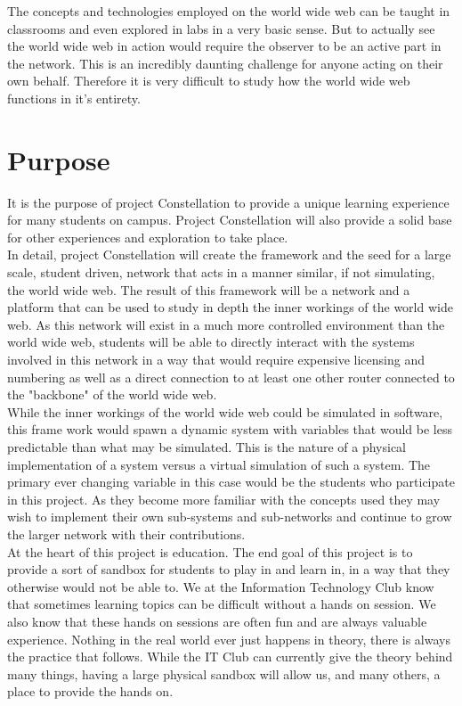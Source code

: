 \documentclass[12pt]{article}
\begin{document}
The concepts and technologies employed on the world wide web can be taught in classrooms and even explored in
labs in a very basic sense. But to actually see the world wide web in action would require the observer to
be an active part in the network. This is an incredibly daunting challenge for anyone acting on their own 
behalf. Therefore it is very difficult to study how the world wide web functions in it's entirety.

\clearpage{}

\section{Purpose}

It is the purpose of project Constellation to provide a unique learning experience for many students on campus. Project Constellation
will also provide a solid base for other experiences and exploration to take place. 
\\

In detail, project Constellation will create the framework and the seed for a large scale, student driven, network that acts in a 
manner similar, if not simulating, the world wide web. The result of this framework will be a network and a platform that can be
used to study in depth the inner workings of the world wide web. As this network will exist in a much more controlled environment
than the world wide web, students will be able to directly interact with the systems involved in this network in a way that would
require expensive licensing and numbering as well as a direct connection to at least one other router connected to the "backbone"
of the world wide web.
\\

While the inner workings of the world wide web could be simulated in software, this frame work would spawn a dynamic system with
variables that would be less predictable than what may be simulated. This is the nature of a physical implementation of a system
versus a virtual simulation of such a system. The primary ever changing variable in this case would be the students who participate
in this project. As they become more familiar with the concepts used they may wish to implement their own sub-systems and sub-networks
and continue to grow the larger network with their contributions.
\\

At the heart of this project is education. The end goal of this project is to provide a sort of sandbox for students to play in and 
learn in, in a way that they otherwise would not be able to. We at the Information Technology Club know that sometimes learning 
topics can be difficult without a hands on session. We also know that these hands on sessions are often fun and are always valuable
experience. Nothing in the real world ever just happens in theory, there is always the practice that follows. While the IT Club can
currently give the theory behind many things, having a large physical sandbox will allow us, and many others, a place to provide
the hands on. 
\\
\end{document}
